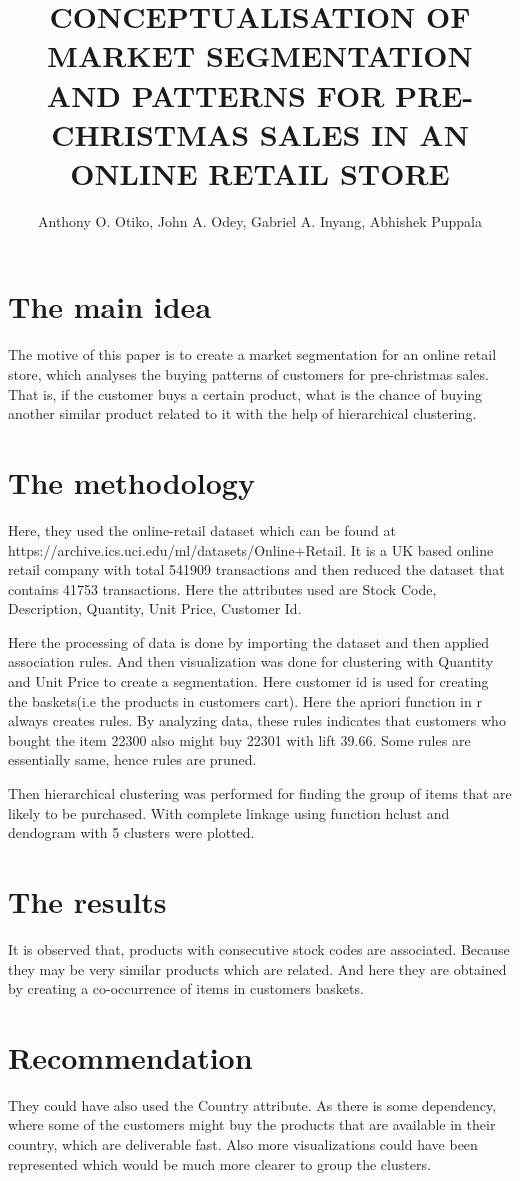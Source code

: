 \documentclass[a4paper]{article}
\title{CONCEPTUALISATION OF MARKET SEGMENTATION AND PATTERNS FOR PRE-CHRISTMAS SALES IN AN ONLINE RETAIL STORE}
\author[1]{Anthony O. Otiko, John A. Odey, Gabriel A. Inyang, Abhishek Puppala}
\begin{document}
\maketitle
\section{The main idea}

The motive of this paper is to create a market segmentation for an online retail store, which analyses the buying patterns of customers for pre-christmas sales. That is, if 
the customer buys a certain product, what is the chance of buying another similar product related to it with the help of hierarchical clustering. 

\section{The methodology }

Here, they used the online-retail dataset which can be found at https://archive.ics.uci.edu/ml/datasets/Online+Retail. It is a UK based online retail company with total 541909 transactions and then reduced the dataset that contains 41753 transactions. Here the attributes used are Stock Code, Description, Quantity, Unit Price, Customer Id. 

Here the processing of data is done by importing the dataset and then applied association rules. And then visualization was done for clustering with Quantity and Unit Price to create a segmentation. Here customer id is used for creating the baskets(i.e the products in customers cart). Here the apriori function in r always creates rules. By analyzing data, these rules indicates that customers who bought the item 22300 also might buy 22301 with lift 39.66. Some rules are essentially same, hence rules are pruned. 

Then hierarchical clustering was performed for finding the group of items that are likely to be purchased. With complete linkage using function hclust and dendogram with 5 clusters were plotted.

\section{The results}
 
It is observed that, products with consecutive stock codes are associated. Because they may be very similar products which are related. And here they are obtained by creating a co-occurrence of items in customers baskets.

\section{Recommendation}

They could have also used the Country attribute. As there is some dependency, where some of the customers might buy the products that are available in their country, which are deliverable fast. Also more visualizations could have been represented which would be much more clearer to group the clusters.
\end{document}

